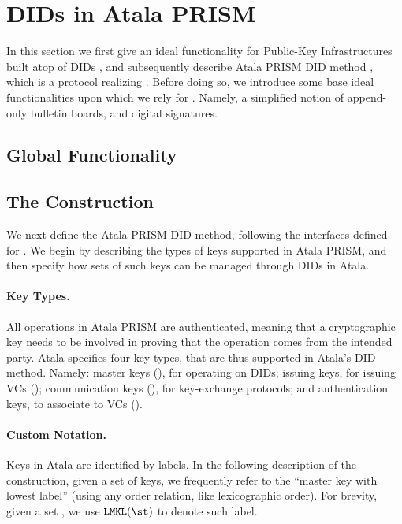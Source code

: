 \section{DIDs in Atala PRISM}
\label{sec:did-atala}

In this section we first give an ideal functionality for Public-Key
Infrastructures built atop of DIDs \IdealGPKIDID, and subsequently describe
Atala PRISM DID method \RealPKIDIDAtala, which is a protocol realizing
\IdealGPKIDID.
%
Before doing so, we introduce some base ideal functionalities upon which we
rely for \RealPKIDIDAtala. Namely, a simplified notion of append-only bulletin
boards, and digital signatures.

\subsection{Global Functionality \IdealGPKIDID}

\subsection{The \RealPKIDIDAtala Construction}

We next define the Atala PRISM DID method, following the interfaces defined for
\IdealGPKIDID. We begin by describing the types of keys supported in Atala
PRISM, and then specify how sets of such keys can be managed through DIDs in
Atala.

\paragraph{Key Types.} %
All operations in Atala PRISM are authenticated, meaning that a cryptographic
key needs to be involved in proving that the operation comes from the intended
party. Atala specifies four key types, that are thus supported in Atala's DID
method. Namely: master keys (\MasterKey), for operating on DIDs; issuing keys,
for issuing VCs (\IssueKey); communication keys (\CommKey), for key-exchange
protocols; and authentication keys, to associate to VCs (\AuthKey).

\paragraph{Custom Notation.} %
Keys in Atala are identified by labels. In the following description of the
\RealPKIDIDAtala construction, given a set of keys, we frequently refer to the
``master key with lowest label'' (using any order relation, like lexicographic
order).  For brevity, given a set \st, we use $\LMKL(\st)$ to denote such label.

